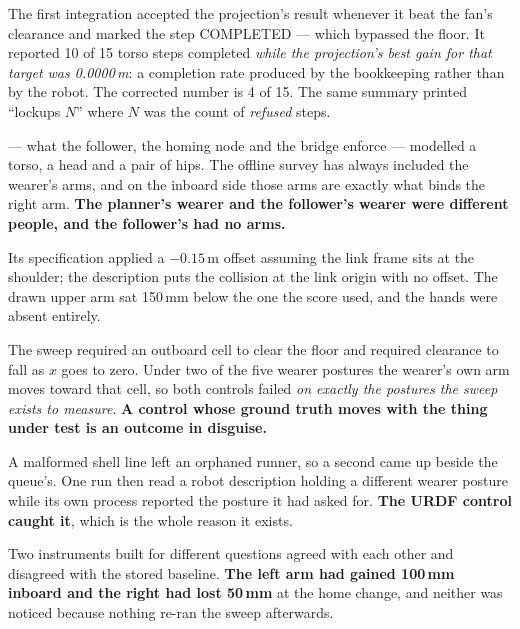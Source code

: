 {The first integration accepted the projection's result whenever it beat the
fan's clearance and marked the step COMPLETED --- which bypassed the floor. It
reported 10 of 15 torso steps completed \emph{while the projection's best gain
for that target was 0.0000\,m}: a completion rate produced by the bookkeeping
rather than by the robot. The corrected number is 4 of 15. The same summary
printed ``lockups $N$'' where $N$ was the count of \emph{refused} steps.}

{ --- what the follower, the homing node and the bridge
enforce --- modelled a torso, a head and a pair of hips. The offline survey has
always included the wearer's arms, and on the inboard side those arms are
exactly what binds the right arm. \textbf{The planner's wearer and the
follower's wearer were different people, and the follower's had no arms.}}

{Its specification applied a $-0.15$\,m offset assuming the link frame sits at
the shoulder; the description puts the collision at the link origin with no
offset. The drawn upper arm sat 150\,mm below the one the score used, and the
hands were absent entirely.}

{The sweep required an outboard cell to clear the floor and required clearance
to fall as $x$ goes to zero. Under two of the five wearer postures the wearer's
own arm moves toward that cell, so both controls failed \emph{on exactly the
postures the sweep exists to measure}. \textbf{A control whose ground truth
moves with the thing under test is an outcome in disguise.}}

{A malformed shell line left an orphaned runner, so a second 
came up beside the queue's. One run then read a robot description holding a
different wearer posture while its own process reported the posture it had
asked for. \textbf{The URDF control caught it}, which is the whole reason it
exists.}

{Two instruments built for different questions agreed with each other and
disagreed with the stored baseline. \textbf{The left arm had gained 100\,mm
inboard and the right had lost 50\,mm} at the home change, and neither was
noticed because nothing re-ran the sweep afterwards.}

